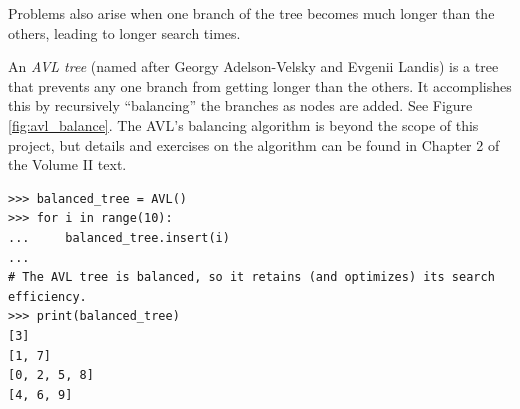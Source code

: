 Problems also arise when one branch of the tree becomes much longer than the others, leading to longer search times.

An \emph{AVL tree} (named after Georgy Adelson-Velsky and Evgenii Landis) is a tree that prevents any one branch from getting longer than the others.
It accomplishes this by recursively ``balancing'' the branches as nodes are added.
See Figure \ref{fig:avl_balance}.
The AVL's balancing algorithm is beyond the scope of this project, but details and exercises on the algorithm can be found in Chapter 2 of the Volume II text.

\begin{lstlisting}
>>> balanced_tree = AVL()
>>> for i in range(10):
...     balanced_tree.insert(i)
... 
# The AVL tree is balanced, so it retains (and optimizes) its search efficiency.
>>> print(balanced_tree)
[3]
[1, 7]
[0, 2, 5, 8]
[4, 6, 9]
\end{lstlisting}

